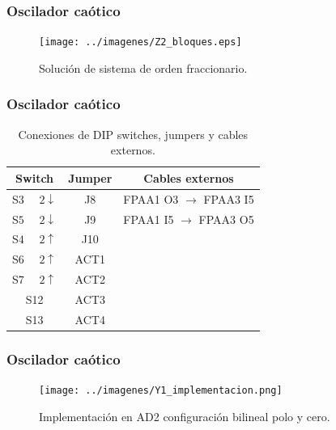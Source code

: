 \documentclass[10pt]{beamer}
\begin{document}
	\begin{frame}
		\frametitle{Oscilador caótico}
		\begin{block}{ }
		\begin{figure}[!ht]
		\caption{Solución de sistema de orden fraccionario.}
		\label{fig:Z2_bloques}
		\centering
		\texttt{[image: ../imagenes/Z2\_bloques.eps]}
	\end{figure}
		\end{block}
	\end{frame}
	\begin{frame}
		\frametitle{Oscilador caótico}
		\begin{block}{ }
		\begin{table}[!ht]                                      
		\centering   
		\caption{Conexiones de DIP switches, jumpers y cables externos.}                            
		\label{tab:resumen_de_imp}                                       
			\begin{tabular}{c c c}                        
			\hline                                              
			Switch & Jumper & Cables externos\\            
			\hline       
			{\color{magenta} S$3$ $\quad2\downarrow$}& J8 & FPAA1 O3 $\rightarrow$ FPAA3 I5\\  
			{\color{magenta} S$5$ $\quad2\downarrow$}& J9& FPAA1 I5 $\rightarrow$ FPAA3 O5\\
			{\color{red} S$4$ $\quad2\uparrow$}&J10&\\ 
			{\color{red} S$6$ $\quad2\uparrow$}&ACT1 &\\
			{\color{blue} S$7$ $\quad2\uparrow$}& ACT2 &\\ 
			S12& ACT3 &\\ 
			S13& ACT4 &\\ 
			\hline                                 
			\end{tabular}                                                             
	\end{table}	
		\end{block}
	\end{frame}	
	\begin{frame}
		\frametitle{Oscilador caótico}
		\begin{figure}[!ht]
		\caption{Implementación en AD2 configuración bilineal polo y cero.} 
		\label{fig:Y1_implementacion}
		\centering
		\texttt{[image: ../imagenes/Y1\_implementacion.png]}
	\end{figure}
	\end{frame}		
\end{document}
